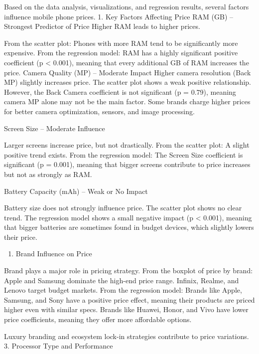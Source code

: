 \documentclass[
]{article}
\providecommand{\tightlist}{%
  \setlength{\itemsep}{0pt}\setlength{\parskip}{0pt}}
\begin{document}
Based on the data analysis, visualizations, and regression results,
several factors influence mobile phone prices. 1. Key Factors Affecting
Price RAM (GB) -- Strongest Predictor of Price Higher RAM leads to
higher prices.

From the scatter plot: Phones with more RAM tend to be significantly
more expensive. From the regression model: RAM has a highly significant
positive coefficient (p \textless{} 0.001), meaning that every
additional GB of RAM increases the price. Camera Quality (MP) --
Moderate Impact Higher camera resolution (Back MP) slightly increases
price. The scatter plot shows a weak positive relationship. However, the
Back Camera coefficient is not significant (p = 0.79), meaning camera MP
alone may not be the main factor. Some brands charge higher prices for
better camera optimization, sensors, and image processing.

Screen Size -- Moderate Influence

Larger screens increase price, but not drastically. From the scatter
plot: A slight positive trend exists. From the regression model: The
Screen Size coefficient is significant (p = 0.001), meaning that bigger
screens contribute to price increases but not as strongly as RAM.

Battery Capacity (mAh) -- Weak or No Impact

Battery size does not strongly influence price. The scatter plot shows
no clear trend. The regression model shows a small negative impact (p
\textless{} 0.001), meaning that bigger batteries are sometimes found in
budget devices, which slightly lowers their price.

\begin{enumerate}
\def\labelenumi{\arabic{enumi}.}
\setcounter{enumi}{1}
\tightlist
\item
  Brand Influence on Price
\end{enumerate}

Brand plays a major role in pricing strategy. From the boxplot of price
by brand: Apple and Samsung dominate the high-end price range. Infinix,
Realme, and Lenovo target budget markets. From the regression model:
Brands like Apple, Samsung, and Sony have a positive price effect,
meaning their products are priced higher even with similar specs. Brands
like Huawei, Honor, and Vivo have lower price coefficients, meaning they
offer more affordable options.

Luxury branding and ecosystem lock-in strategies contribute to price
variations. 3. Processor Type and Performance
\end{document}
